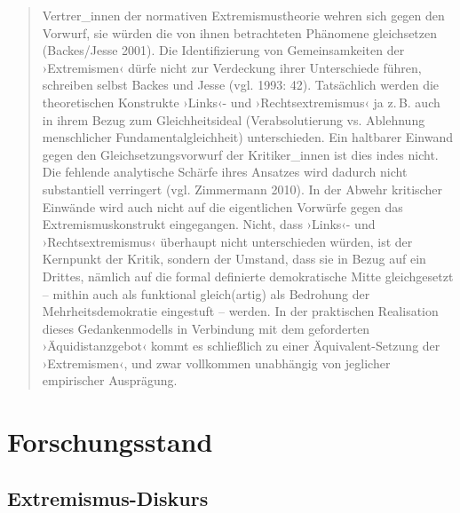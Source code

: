 \begin{quote}
Vertrer\_innen der normativen Extremismustheorie wehren sich gegen den Vorwurf, sie würden die von ihnen betrachteten Phänomene gleichsetzen (Backes{\slash}Jesse 2001). Die Identifizierung von Gemeinsamkeiten der ›Extremismen‹ dürfe nicht zur Verdeckung ihrer Unterschiede führen, schreiben selbst Backes und Jesse (vgl. 1993: 42). Tatsächlich werden die theoretischen Konstrukte ›Links‹- und ›Rechtsextremismus‹ ja z.\,B. auch in ihrem Bezug zum Gleichheitsideal (Verabsolutierung vs. Ablehnung menschlicher Fundamentalgleichheit) unterschieden. Ein haltbarer Einwand gegen den Gleichsetzungsvorwurf der Kritiker\_innen ist dies indes nicht. Die fehlende analytische Schärfe ihres Ansatzes wird dadurch nicht substantiell verringert (vgl. Zimmermann 2010). In der Abwehr kritischer Einwände wird auch nicht auf die eigentlichen Vorwürfe gegen das Extremismuskonstrukt eingegangen. Nicht, dass ›Links‹- und ›Rechtsextremismus‹ überhaupt nicht unterschieden würden, ist der Kernpunkt der Kritik, sondern der Umstand, dass sie in Bezug auf ein Drittes, nämlich auf die formal definierte demokratische Mitte gleichgesetzt -- mithin auch als funktional gleich(artig) als Bedrohung der Mehrheitsdemokratie eingestuft -- werden. In der praktischen Realisation dieses Gedankenmodells in Verbindung mit dem geforderten ›Äquidistanzgebot‹ kommt es schließlich zu einer Äquivalent-Setzung der ›Extremismen‹, und zwar vollkommen unabhängig von jeglicher empirischer Ausprägung. \autocite[10-11]{doelemeyerEinleitungOrdnungMachtExtremismus2011}
\end{quote}

\section{Forschungsstand}\label{forschungsstand}

\subsection{Extremismus-Diskurs}\label{extremismus-diskurs}

